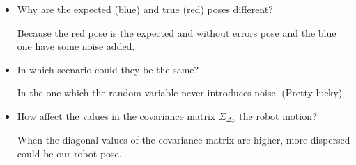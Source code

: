 \documentclass[11pt]{article}
\begin{document}
\begin{itemize}
\item
  Why are the expected (blue) and true (red) poses different?

  Because the red pose is the expected and without errors pose and the
  blue one have some noise added.
\item
  In which scenario could they be the same?

  In the one which the random variable never introduces noise. (Pretty
  lucky)
\item
  How affect the values in the covariance matrix \(\Sigma_{\Delta p}\)
  the robot motion?

  When the diagonal values of the covariance matrix are higher, more
  dispersed could be our robot pose.
\end{itemize}


    
    
    
\end{document}
